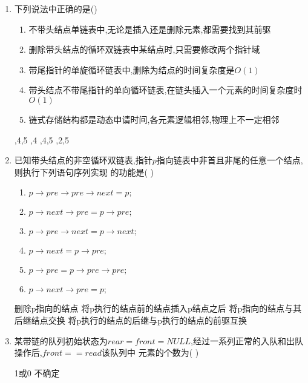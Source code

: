 \documentclass[12pt, a4paper, oneside, UTF8]{ctexbook}
\begin{document}
\begin{enumerate}
    \item 下列说法中正确的是() 
    \begin{enumerate}[label= (\arabic*)]
        \item 不带头结点单链表中,无论是插入还是删除元素,都需要找到其前驱 
        \item 删除带头结点的循环双链表中某结点时,只需要修改两个指针域
        \item 带尾指针的单旋循环链表中,删除为结点的时间复杂度是$O(1)$
        \item 带头结点不带尾指针的单向循环链表,在链头插入一个元素的时间复杂度时$O(1)$
        \item 链式存储结构都是动态申请时间,各元素逻辑相邻,物理上不一定相邻 
    \end{enumerate}
    \begin{choices}
        ,4,5 ,4 ,4,5 ,2,5
    \end{choices}

    \item 已知带头结点的非空循环双链表,指针$p$指向链表中非首且非尾的任意一个结点,则执行下列语句序列实现
    的功能是(   ) 
    \begin{enumerate}[label= (\arabic*)]
        \item $p\rightarrow pre \rightarrow pre \rightarrow next = p;$ 
        \item $p\rightarrow next \rightarrow pre = p \rightarrow pre;$
        \item $p\rightarrow pre\rightarrow next = p\rightarrow next;$
        \item $p\rightarrow next = p\rightarrow pre;$
        \item $p\rightarrow pre = p\rightarrow pre \rightarrow pre;$
        \item $p\rightarrow next \rightarrow pre = p;$
    \end{enumerate}

    \begin{choices}[1]
        \task 删除p指向的结点 
        \task 将p执行的结点前的结点插入p结点之后 
        \task 将p指向的结点与其后继结点交换
        \task 将p执行的结点的后继与p执行的结点的前驱互换 
    \end{choices}

    \item 某带链的队列初始状态为$rear=front=NULL$,经过一系列正常的入队和出队操作后,$front==read$该队列中
    元素的个数为(   )
    \begin{choices}
          \task 1或0 \task 不确定
    \end{choices}


\end{enumerate}
\end{document}

